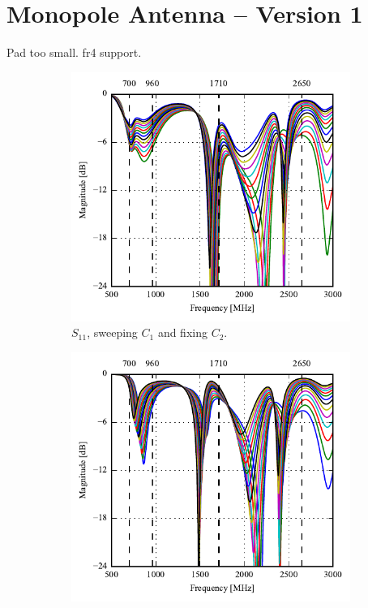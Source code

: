 \section{Monopole Antenna -- Version 1}
Pad too small. fr4 support. 

\begin{figure}[htbp]
   \begin{subfigure}[b]{0.49\linewidth}
        \centering
        \includegraphics{img/tech_sol/monopole/prototype_v1/s11}
        \caption{$S_{11}$, sweeping $C_1$ and fixing $C_2$.}
        \label{fig:ant1_s11}
    \end{subfigure}
    \hfill
    \begin{subfigure}[b]{0.49\linewidth}
        \centering
        \includegraphics{img/tech_sol/monopole/prototype_v1/s22}

\end{subfigure}
\end{figure}
